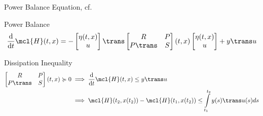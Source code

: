 {    \begin{frame}{Power Balance Equation, cf.~\cite[Section~6.1]{Mehrmann2022}}
        \begin{block}{Power Balance}
            \begin{equation*}
                \frac{\text{d}}{\text{d}t} \mcl{H}(t, x) = - \begin{bmatrix}
                    \eta(t, x) \\
                    u
                \end{bmatrix}\trans \begin{bmatrix}
                    R & P \\
                    P\trans & S
                \end{bmatrix}(t, x) \begin{bmatrix}
                    \eta(t, x) \\
                    u
                \end{bmatrix} + y\trans u
            \end{equation*}
        \end{block}

        \begin{block}{Dissipation Inequality}
            \begin{align*}
                \begin{bmatrix}
                    R & P \\
                    P\trans & S
                \end{bmatrix}(t, x) \succcurlyeq 0 &\implies \frac{\text{d}}{\text{d}t} \mcl{H}(t, x) \leq y\trans u \\
                 &\implies \mcl{H}(t_2, x(t_2)) - \mcl{H}(t_1, x(t_2)) \leq \int\limits_{t_1}^{t_2} y(s)\trans u(s) ds
            \end{align*}
        \end{block}
    \end{frame}

}
